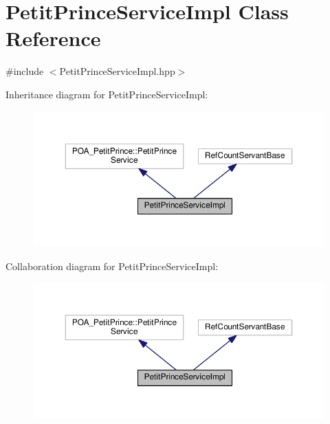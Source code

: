 \hypertarget{class_petit_prince_service_impl}{}\section{Petit\+Prince\+Service\+Impl Class Reference}
\label{class_petit_prince_service_impl}


{\ttfamily \#include $<$Petit\+Prince\+Service\+Impl.\+hpp$>$}



Inheritance diagram for Petit\+Prince\+Service\+Impl\+:
\nopagebreak
\begin{figure}[H]
\begin{center}
\leavevmode
\includegraphics[width=350pt]{class_petit_prince_service_impl__inherit__graph}
\end{center}
\end{figure}


Collaboration diagram for Petit\+Prince\+Service\+Impl\+:
\nopagebreak
\begin{figure}[H]
\begin{center}
\leavevmode
\includegraphics[width=350pt]{class_petit_prince_service_impl__coll__graph}
\end{center}
\end{figure}
